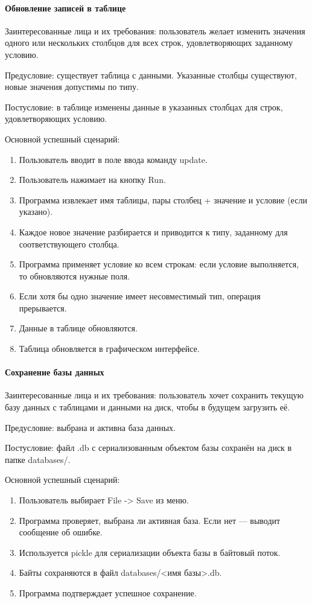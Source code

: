 \paragraph{Обновление записей в таблице}

Заинтересованные лица и их требования: пользователь желает изменить значения одного или нескольких столбцов для всех строк, удовлетворяющих заданному условию.

Предусловие: существует таблица с данными. Указанные столбцы существуют, новые значения допустимы по типу.

Постусловие: в таблице изменены данные в указанных столбцах для строк, удовлетворяющих условию.

Основной успешный сценарий:
\begin{enumerate}
	\item Пользователь вводит в поле ввода команду update.
	\item Пользователь нажимает на кнопку Run.		
	\item Программа извлекает имя таблицы, пары столбец + значение и условие (если указано).	
	\item Каждое новое значение разбирается и приводится к типу, заданному для соответствующего столбца.	
	\item Программа применяет условие ко всем строкам: если условие выполняется, то обновляются нужные поля.	
	\item Если хотя бы одно значение имеет несовместимый тип, операция прерывается.	
	\item Данные в таблице обновляются.
	\item Таблица обновляется в графическом интерфейсе.
\end{enumerate}

\paragraph{Сохранение базы данных}

Заинтересованные лица и их требования: пользователь хочет сохранить текущую базу данных с таблицами и данными на диск, чтобы в будущем загрузить её.

Предусловие: выбрана и активна база данных.

Постусловие: файл .db с сериализованным объектом базы сохранён на диск в папке databases/.

Основной успешный сценарий:
\begin{enumerate}
	\item Пользователь выбирает File -> Save из меню.	
	\item Программа проверяет, выбрана ли активная база. Если нет — выводит сообщение об ошибке.	
	\item Используется pickle для сериализации объекта базы в байтовый поток.	
	\item Байты сохраняются в файл databases/<имя базы>.db.	
	\item Программа подтверждает успешное сохранение.
\end{enumerate}

